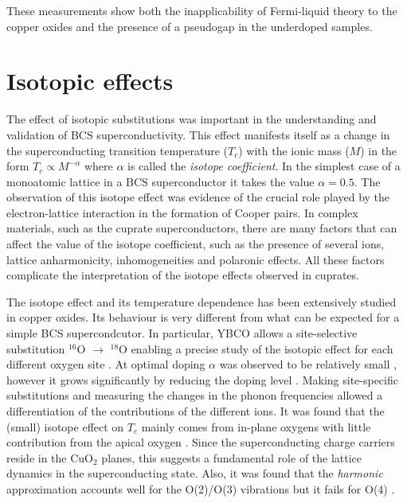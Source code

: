 These measurements show both the inapplicability of Fermi-liquid theory to the copper oxides and the presence of a pseudogap in the underdoped samples.

\section{Isotopic effects}
\label{sec:isotopic_effects}

The effect of isotopic substitutions was important in the understanding and validation of BCS superconductivity.
This effect manifests itself as a change in the superconducting transition temperature ($T_c$) with the ionic mass ($M$) in the form $T_c \propto M^{-\alpha}$ where $\alpha$ is called the \textit{isotope coefficient}.
In the simplest case of a monoatomic lattice in a BCS superconductor it takes the value $\alpha=0.5$.
The observation of this isotope effect \cite{Reynolds1950,Maxwell1950} was evidence of the crucial role played by the electron-lattice interaction in the formation of Cooper pairs. 
In complex materials, such as the cuprate superconductors, there are many factors that can affect the value of the isotope coefficient, such as the presence of several ions, lattice anharmonicity, inhomogeneities and polaronic effects.
All these factors complicate the interpretation of the isotope effects observed in cuprates.

The isotope effect and its temperature dependence has been extensively studied in copper oxides.
Its behaviour is very different from what can be expected for a simple BCS supercondcutor.
In particular, YBCO allows a site-selective substitution $^{16}$O $\rightarrow$ $^{18}$O enabling a precise study of the isotopic effect for each different oxygen site \cite{Conder1993,Cardona1988}. 
At optimal doping $\alpha$ was observed to be relatively small \cite{Thomsen1988}, however it grows significantly by reducing the doping level \cite{Bishop2007}.
Making site-specific substitutions and measuring the changes in the phonon frequencies  allowed a differentiation of the contributions of the different ions.
It was found that the (small) isotope effect on $T_c$ mainly comes from in-plane oxygens with little contribution from the apical oxygen  \cite{Ruani1994,Zech1994}.
Since the superconducting charge carriers reside in the CuO$_2$ planes, this suggests a fundamental role of the lattice dynamics in the superconducting state.
Also, it was found that the \textit{harmonic} approximation accounts well for the O(2)/O(3) vibrations but it fails for O(4) \cite{Ruani1994}.

